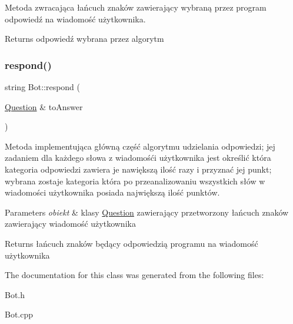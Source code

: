 Metoda zwracająca łańcuch znaków zawierający wybraną przez program odpowiedź na wiadomość użytkownika. 

\begin{DoxyReturn}{Returns}
odpowiedź wybrana przez algorytm 
\end{DoxyReturn}
\mbox{\label{class_bot_a480543fe4ce73868ce89217cc1d0e8a8}} 
\subsubsection{\texorpdfstring{respond()}{respond()}}
{\footnotesize\ttfamily string Bot\+::respond (\begin{DoxyParamCaption}\item[{\mbox{\hyperlink{class_question}{Question}} \&}]{to\+Answer }\end{DoxyParamCaption})}



Metoda implementująca główną część algorytmu udzielania odpowiedzi; jej zadaniem dla każdego słowa z wiadomośći użytkownika jest określić która kategoria odpowiedzi zawiera je nawiększą ilość razy i przyznać jej punkt; wybrana zostaje kategoria która po przeanalizowaniu wszystkich słów w wiadomości użytkownika posiada największą ilość punktów. 


\begin{DoxyParams}{Parameters}
{\em obiekt} & klasy \mbox{\hyperlink{class_question}{Question}} zawierający przetworzony łańcuch znaków zawierający wiadomość użytkownika \\
\hline
\end{DoxyParams}
\begin{DoxyReturn}{Returns}
łańcuch znaków będący odpowiedzią programu na wiadomość użytkownika 
\end{DoxyReturn}


The documentation for this class was generated from the following files\+:\begin{DoxyCompactItemize}
\item 
Bot.\+h\item 
Bot.\+cpp\end{DoxyCompactItemize}
